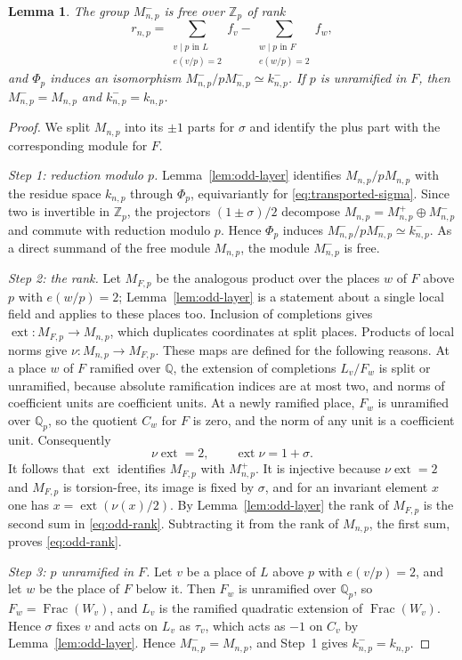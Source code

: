\documentclass[11pt]{article}
\theoremstyle{plain}
\newtheorem{lemma}[theorem]{Lemma}
\theoremstyle{definition}
\theoremstyle{remark}
\DeclareMathOperator{\Frac}{Frac}
\newcommand{\Z}{\mathbb Z}
\newcommand{\Q}{\mathbb Q}
\begin{document}
\begin{lemma}\label{lem:odd-minus-rank}
The group $M_{n,p}^-$ is free over $\Z_p$ of rank
\begin{equation}\label{eq:odd-rank}
 r_{n,p}=\sum_{\substack{v\mid p\text{ in }L\\e(v/p)=2}}f_v
          -\sum_{\substack{w\mid p\text{ in }F\\e(w/p)=2}}f_w,
\end{equation}
and $\Phi_p$ induces an isomorphism
$M_{n,p}^-/pM_{n,p}^-\simeq k_{n,p}^-$.
If $p$ is unramified in $F$, then $M_{n,p}^-=M_{n,p}$ and
$k_{n,p}^-=k_{n,p}$.
\end{lemma}
\begin{proof}
We split $M_{n,p}$ into its $\pm1$ parts for $\sigma$ and identify the
plus part with the corresponding module for $F$.

\emph{Step 1: reduction modulo $p$.}  Lemma~\ref{lem:odd-layer}
identifies $M_{n,p}/pM_{n,p}$ with the residue space $k_{n,p}$ through
$\Phi_p$, equivariantly for \eqref{eq:transported-sigma}.  Since two is
invertible in $\Z_p$, the projectors $(1\pm\sigma)/2$ decompose
$M_{n,p}=M_{n,p}^+\oplus M_{n,p}^-$ and commute with reduction modulo
$p$.  Hence $\Phi_p$ induces $M_{n,p}^-/pM_{n,p}^-\simeq k_{n,p}^-$.  As a
direct summand of the free module $M_{n,p}$, the module $M_{n,p}^-$ is
free.

\emph{Step 2: the rank.}  Let $M_{F,p}$ be the analogous product over the
places $w$ of $F$ above $p$ with $e(w/p)=2$; Lemma~\ref{lem:odd-layer}
is a statement about a single local field and applies to these places
too.  Inclusion of completions gives
$\operatorname{ext}:M_{F,p}\to M_{n,p}$, which duplicates coordinates at
split places.  Products of local norms give $\nu:M_{n,p}\to M_{F,p}$.
These maps are defined for the following reasons.  At a place $w$ of $F$
ramified over $\Q$, the extension of completions $L_v/F_w$ is split or
unramified, because absolute ramification indices are at most two, and
norms of coefficient units are coefficient units.  At a newly ramified
place, $F_w$ is unramified over $\Q_p$, so the quotient $C_w$ for $F$ is
zero, and the norm of any unit is a coefficient unit.  Consequently
\[
 \nu\operatorname{ext}=2,\qquad \operatorname{ext}\nu=1+\sigma.
\]
It follows that $\operatorname{ext}$ identifies $M_{F,p}$ with
$M_{n,p}^+$.  It is injective because $\nu\operatorname{ext}=2$ and
$M_{F,p}$ is torsion-free, its image is fixed by $\sigma$, and for an
invariant element $x$ one has $x=\operatorname{ext}(\nu(x)/2)$.  By
Lemma~\ref{lem:odd-layer} the rank of $M_{F,p}$ is the second sum in
\eqref{eq:odd-rank}.  Subtracting it from the rank of $M_{n,p}$, the first
sum, proves \eqref{eq:odd-rank}.

\emph{Step 3: $p$ unramified in $F$.}  Let $v$ be a place
of $L$ above $p$ with $e(v/p)=2$, and let $w$ be the place of $F$ below
it.  Then $F_w$ is unramified over $\Q_p$, so $F_w=\Frac(W_v)$, and
$L_v$ is the ramified quadratic extension of $\Frac(W_v)$.
Hence $\sigma$ fixes $v$ and acts on $L_v$ as $\tau_v$, which acts as
$-1$ on $C_v$ by Lemma~\ref{lem:odd-layer}.  Hence $M_{n,p}^-=M_{n,p}$, and Step~1
gives $k_{n,p}^-=k_{n,p}$.
\end{proof}
\end{document}
